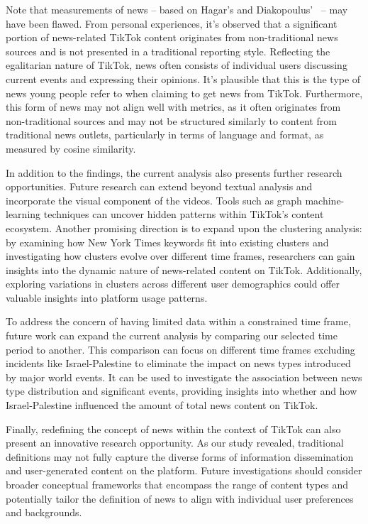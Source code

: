 \documentclass{article}
\begin{document}
{\noindent}Note that measurements of news – based on Hagar’s and Diakopoulus’~\cite{hagar2023algorithmic} – may have been flawed. From personal experiences, it's observed that a significant portion of news-related TikTok content originates from non-traditional news sources and is not presented in a traditional reporting style. Reflecting the egalitarian nature of TikTok, news often consists of individual users discussing current events and expressing their opinions. It's plausible that this is the type of news young people refer to when claiming to get news from TikTok. Furthermore, this form of news may not align well with metrics, as it often originates from non-traditional sources and may not be structured similarly to content from traditional news outlets, particularly in terms of language and format, as measured by cosine similarity.\newline

{\noindent}In addition to the findings, the current analysis also presents further research opportunities. Future research can extend beyond textual analysis and incorporate the visual component of the videos. Tools such as graph machine-learning techniques can uncover hidden patterns within TikTok's content ecosystem. Another promising direction is to expand upon the clustering analysis: by examining how New York Times keywords fit into existing clusters and investigating how clusters evolve over different time frames, researchers can gain insights into the dynamic nature of news-related content on TikTok. Additionally, exploring variations in clusters across different user demographics could offer valuable insights into platform usage patterns.\newline

{\noindent}To address the concern of having limited data within a constrained time frame, future work can expand the current analysis by comparing our 
selected time period to another. This comparison can focus on different time 
frames excluding incidents like Israel-Palestine to eliminate the impact on 
news types introduced by major world events. It can be used to investigate the 
association between news type distribution and significant events, providing 
insights into whether and how Israel-Palestine influenced the amount of total 
news content on TikTok.\newline

{\noindent}Finally, redefining the concept of news within the context of TikTok can also present an innovative research opportunity. As our study revealed, traditional definitions may not fully capture the diverse forms of information dissemination and user-generated content on the platform. Future investigations should consider broader conceptual frameworks that encompass the range of content types and potentially tailor the definition of news to align with individual user preferences and backgrounds. \newline
\end{document}
